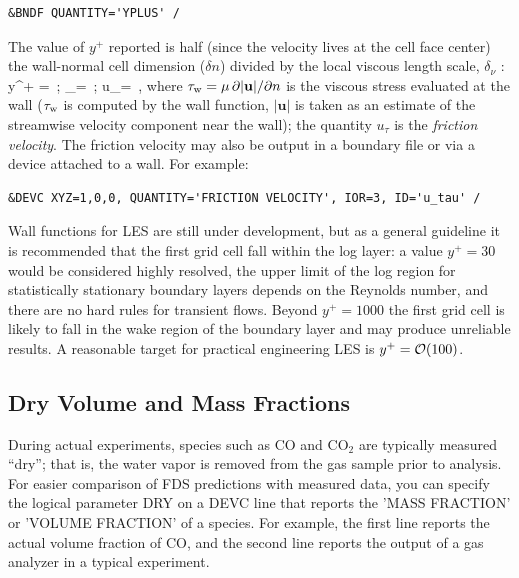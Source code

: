 \documentclass[11pt]{book}
\begin{document}
\begin{lstlisting}
&BNDF QUANTITY='YPLUS' /
\end{lstlisting}

\noindent
The value of $y^+$ reported is half (since the velocity lives at the cell face center) the wall-normal cell dimension ($\delta n$) divided by the local viscous length scale, $\delta_\nu$ \cite{Pope:2000}:
\be
y^+ =   \,\mbox{;} \quad\quad \delta_\nu =  \,\mbox{;} \quad\quad u_\tau =  \,\mbox{,}
\ee
where $\tau_{\rm w} = \mu\,\partial |\mathbf{u}|/\partial n$ is the viscous stress evaluated at the wall ($\tau_{\rm w}$ is computed by the wall function, $|\mathbf{u}|$ is taken as an estimate of the streamwise velocity component near the wall); the quantity $u_\tau$ is the \emph{friction velocity}.  The friction velocity may also be output in a boundary file or via a device attached to a wall.  For example:
\begin{lstlisting}
&DEVC XYZ=1,0,0, QUANTITY='FRICTION VELOCITY', IOR=3, ID='u_tau' /
\end{lstlisting}

\noindent Wall functions for LES are still under development, but as a general guideline it is recommended that the first grid cell fall within the log layer: a value $y^+=30$ would be considered highly resolved, the upper limit of the log region for statistically stationary boundary layers depends on the Reynolds number, and there are no hard rules for transient flows.  Beyond $y^+=1000$ the first grid cell is likely to fall in the wake region of the boundary layer and may produce unreliable results.  A reasonable target for practical engineering LES is $y^+ = {\cal O}(100)$.

\subsection{Dry Volume and Mass Fractions}
\label{info:dry}

During actual experiments, species such as CO and CO$_2$ are typically measured ``dry''; that is, the water
vapor is removed from the gas sample prior to analysis.  For easier comparison of FDS predictions with measured data,
you can specify the logical parameter {\ct DRY} on a {\ct DEVC} line that reports the {\ct 'MASS FRACTION'} or
{\ct 'VOLUME FRACTION'} of a species.  For example, the first line reports
the actual volume fraction of CO, and the second line reports the output of a gas analyzer in a typical experiment.
\end{document}
